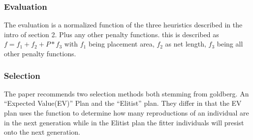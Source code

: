 \documentclass{article}
\begin{document}
\subsubsection{Evaluation}
The evaluation is a normalized function of the three heuristics described in the intro of section 2. Plus any other penalty functions. this is described as $f = f_1 + f_2 + P * f_3$ with $f_1$ being placement area, $f_2$ as net length, $f_3$ being all other penalty functions. 

\subsubsection{Selection}
The paper recommends two selection methods both stemming from goldberg. An ``Expected Value(EV)'' Plan and the ``Elitist'' plan. They differ in that the EV plan uses the function to determine how many reproductions of an individual are in the next generation while in the Elitist plan the fitter individuals will presist onto the next generation.
\end{document}
